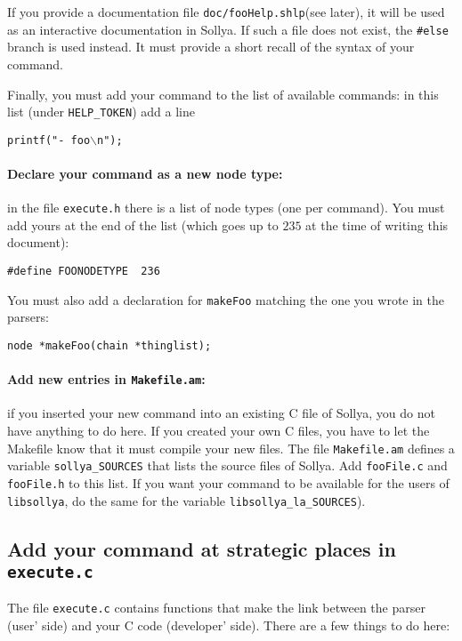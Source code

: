 \documentclass{article}
\newcommand{\commandName}{\texttt{foo}\xspace}
\newcommand{\commandFile}[1]{\texttt{fooFile#1}\xspace}
\newcommand{\commandMakeFunc}{\texttt{makeFoo}}
\newcommand{\commandNodeName}{\texttt{FOONODETYPE}\xspace}
\newcommand{\commandShlp}{\texttt{doc/fooHelp.shlp}\xspace}
\begin{document}
If you provide a documentation file \commandShlp (see later), it will be used as an interactive documentation in Sollya. If such a file does not exist, the \texttt{\#else} branch is used instead. It must provide a short recall of the syntax of your command.

Finally, you must add your command to the list of available commands: in this list (under \texttt{HELP\_TOKEN}) add a line
\begin{center}
  \texttt{printf("- }\commandName$\backslash$\texttt{n");}
\end{center}


\paragraph{Declare your command as a new node type: } in the file \texttt{execute.h} there is a list of node types (one per command). You must add yours at the end of the list (which goes up to $235$ at the time of writing this document):
\begin{center}
  \texttt{\#define }\commandNodeName \texttt{~~236}
\end{center}

You must also add a declaration for \commandMakeFunc{} matching the one you wrote in the parsers:
\begin{center}
\texttt{node *}\commandMakeFunc\texttt{(chain *thinglist);}
\end{center}


\paragraph{Add new entries in \texttt{Makefile.am}: } if you inserted your new command into an existing C file of Sollya, you do not have anything to do here. If you created your own C files, you have to let the Makefile know that it must compile your new files. The file \texttt{Makefile.am} defines a variable \texttt{sollya\_SOURCES} that lists the source files of Sollya. Add \commandFile{.c} and \commandFile{.h} to this list. If you want your command to be available for the users of \texttt{libsollya}, do the same for the variable \texttt{libsollya\_la\_SOURCES}).


\subsection{Add your command at strategic places in \texttt{execute.c}}
The file \texttt{execute.c} contains functions that make the link between the parser (user' side) and your C code (developer' side). There are a few things to do here:
\end{document}
